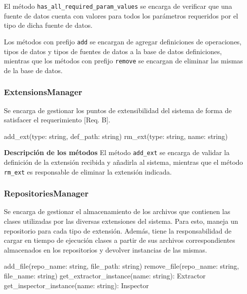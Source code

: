 El método \texttt{has\_all\_required\_param\_values} se encarga de verificar que una fuente de datos cuenta con valores para todos los parámetros requeridos por el tipo de dicha fuente de datos.

Los métodos con prefijo \texttt{add} se encargan de agregar definiciones de operaciones, tipos de datos y tipos de fuentes de datos a la base de datos definiciones, mientras que los métodos con prefijo \texttt{remove} se encargan de eliminar las mismas de la base de datos.

\subsubsection{ExtensionsManager}
Se encarga de gestionar los puntos de extensibilidad del sistema de forma de satisfacer el requerimiento [Req. B].
\newline

\begin{python}[title=Interfaz ExtensionsManager, captionpos=b]
add_ext(type: string, def_path: string)
rm_ext(type: string, name: string)
\end{python}

\textbf{Descripción de los métodos} \newline
El método \texttt{add\_ext} se encarga de validar la definición de la extensión recibida y añadirla al sistema, mientras que el método \texttt{rm\_ext} es responsable de eliminar la extensión indicada.

\subsubsection{RepositoriesManager}
Se encarga de gestionar el almacenamiento de los archivos que contienen las clases utilizadas por las diversas extensiones del sistema. Para esto, maneja un repositorio para cada tipo de extensión. Además, tiene la responsabilidad de cargar en tiempo de ejecución clases a partir de sus archivos correspondientes almacenados en los repositorios y devolver instancias de las mismas.
\newline

\begin{python}[title=Interfaz RepositoriesManager, captionpos=b]
add_file(repo_name: string, file_path: string)
remove_file(repo_name: string, file_name: string)
get_extractor_instance(name: string): Extractor
get_inspector_instance(name: string): Inspector
\end{python}

